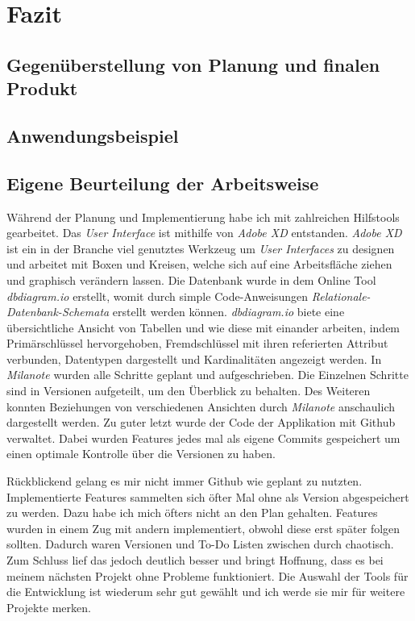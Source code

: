 \chapter{Fazit}
\section{Gegenüberstellung von Planung und finalen Produkt}
\section{Anwendungsbeispiel}
\section{Eigene Beurteilung der Arbeitsweise}
Während der Planung und Implementierung habe ich mit zahlreichen Hilfstools gearbeitet. Das \textit{User Interface} ist mithilfe von \textit{Adobe XD} entstanden. \textit{Adobe XD} ist ein in der Branche viel genutztes Werkzeug um \textit{User Interfaces} zu designen und arbeitet mit Boxen und Kreisen, welche sich auf eine Arbeitsfläche ziehen und graphisch verändern lassen. Die Datenbank wurde in dem Online Tool \textit{dbdiagram.io} erstellt, womit durch simple Code-Anweisungen \textit{Relationale-Datenbank-Schemata} erstellt werden können. \textit{dbdiagram.io} biete eine übersichtliche Ansicht von Tabellen und wie diese mit einander arbeiten, indem Primärschlüssel hervorgehoben, Fremdschlüssel mit ihren referierten Attribut verbunden, Datentypen dargestellt und Kardinalitäten angezeigt werden. In \textit{Milanote} wurden alle Schritte geplant und aufgeschrieben. Die Einzelnen Schritte sind in Versionen aufgeteilt, um den Überblick zu behalten. Des Weiteren konnten Beziehungen von verschiedenen Ansichten durch \textit{Milanote} anschaulich dargestellt werden. Zu guter letzt wurde der Code der Applikation mit Github verwaltet. Dabei wurden Features jedes mal als eigene Commits gespeichert um einen optimale Kontrolle über die Versionen zu haben.

Rückblickend gelang es mir nicht immer Github wie geplant zu nutzten. Implementierte Features sammelten sich öfter Mal ohne als Version abgespeichert zu werden. Dazu habe ich mich öfters nicht an den Plan gehalten. Features wurden in einem Zug mit andern implementiert, obwohl diese erst später folgen sollten. Dadurch waren Versionen und To-Do Listen zwischen durch chaotisch. Zum Schluss lief das jedoch deutlich besser und bringt Hoffnung, dass es bei meinem nächsten Projekt ohne Probleme funktioniert. Die Auswahl der Tools für die Entwicklung ist wiederum sehr gut gewählt und ich werde sie mir für weitere Projekte merken.


